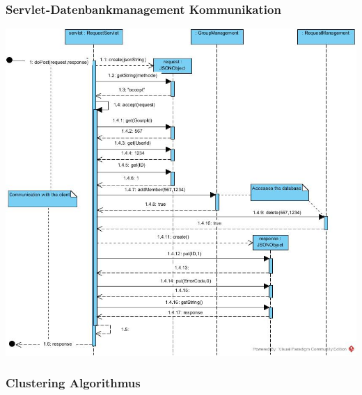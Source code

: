 \subsubsection{Servlet-Datenbankmanagement Kommunikation}
\includegraphics[width=1.1\textwidth]{Servlet_MAnagement.jpg}

\subsubsection{Clustering Algorithmus}
	
	\newpage